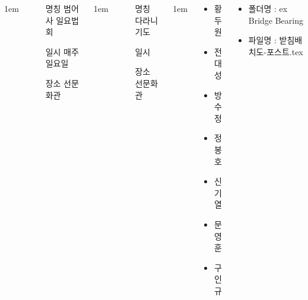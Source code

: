 \documentclass[	20pt, 
							a1paper, 
							portrait, %
							margin=0mm, %
							innermargin=10mm,  		%
							colspace=5mm, 
							subcolspace=0mm
							]{tikzposter}
\begin{document}
\begin{columns}


			{
					\setlength{\leftmargini}{4em}
					\setlength{\labelsep} {1em}
				\begin{LARGE}
					\begin{itemize}
					\item [명칭] 범어사 일요법회
					\item [일시] 매주 일요일
					\item [장소] 선문화관
					\end{itemize}
				\end{LARGE}
			}



			{
					\setlength{\leftmargini}{4em}
					\setlength{\labelsep} {1em}
				\begin{LARGE}
					\begin{itemize}
					\item [명칭] 다라니기도
					\item [일시] 
					\item [장소] 선문화관
					\end{itemize}
				\end{LARGE}
			}


			{
					\setlength{\leftmargini}{4em}
					\setlength{\labelsep} {1em}
				\begin{LARGE}
					\begin{itemize}
					\item  황두원 
					\item  전대성 
					\item  방수정 
					\item  정봉호 
					\item  신기열 
					\item  문영훈 
					\item  구인규 
					\end{itemize}
				\end{LARGE}
			} %

			{
				\begin{LARGE}
					\begin{itemize}
					\item 폴더명 : ex Bridge Bearing
					\item 파일명 : 받침배치도-포스트.tex
					\end{itemize}
				\end{LARGE}
			}

	\end{columns}
\end{document}
